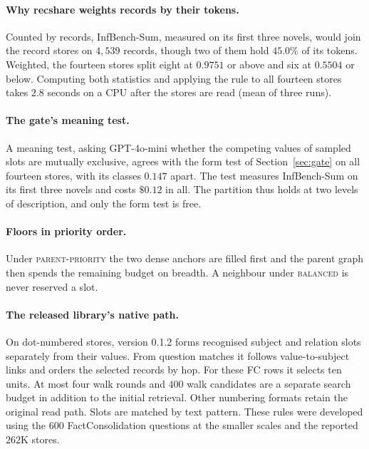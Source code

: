 \documentclass{article}
\newcommand{\cov}{\textsf{recshare}}
\newcommand{\balanced}{\textsc{balanced}}
\newcommand{\parprio}{\textsc{parent-priority}}
\begin{document}
\paragraph{Why \cov{} weights records by their tokens.} Counted by records, InfBench-Sum, measured on its first three novels, would join the record stores on $4{,}539$ records, though two of them hold $45.0\%$ of its tokens. Weighted, the fourteen stores split eight at $0.9751$ or above and six at $0.5504$ or below. Computing both statistics and applying the rule to all fourteen stores takes $2.8$ seconds on a CPU after the stores are read (mean of three runs).

\paragraph{The gate's meaning test.} A meaning test, asking GPT-4o-mini whether the competing values of sampled slots are mutually exclusive, agrees with the form test of Section~\ref{sec:gate} on all fourteen stores, with its classes $0.147$ apart. The test measures InfBench-Sum on its first three novels and costs $\$0.12$ in all. The partition thus holds at two levels of description, and only the form test is free.

\paragraph{Floors in priority order.} Under \parprio{} the two dense anchors are filled first and the parent graph then spends the remaining budget on breadth. A neighbour under \balanced{} is never reserved a slot.

\paragraph{The released library's native path.} On dot-numbered stores, version 0.1.2 forms recognised subject and relation slots separately from their values. From question matches it follows value-to-subject links and orders the selected records by hop. For these FC rows it selects ten units. At most four walk rounds and $400$ walk candidates are a separate search budget in addition to the initial retrieval. Other numbering formats retain the original read path. Slots are matched by text pattern. These rules were developed using the $600$ FactConsolidation questions at the smaller scales and the reported $262$K stores.
\end{document}
